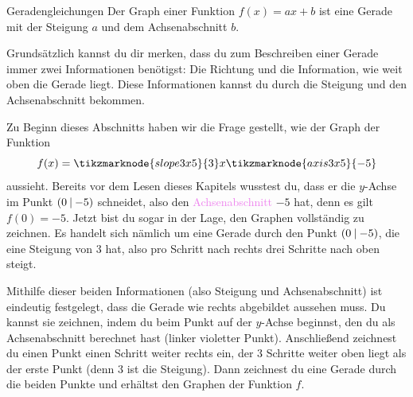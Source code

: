 \documentclass[../../main.tex]{subfiles}
\begin{document}
\begin{theorem}{Geradengleichungen}
    Der Graph einer Funktion $f(x)=ax+b$ ist eine Gerade mit der Steigung $a$ und dem Achsenabschnitt $b$.
\end{theorem}

Grundsätzlich kannst du dir merken, dass du zum Beschreiben einer Gerade immer zwei Informationen benötigst: Die Richtung und die Information, wie weit oben die Gerade liegt. Diese Informationen kannst du durch die Steigung und den Achsenabschnitt bekommen.

\begin{example}{}
    Zu Beginn dieses Abschnitts haben wir die Frage gestellt, wie der Graph der Funktion 
    \[f(x)=\tikzmarknode{slope3x5}{3}x\tikzmarknode{axis3x5}{-5}\] 
    aussieht. Bereits vor dem Lesen dieses Kapitels wusstest du, dass er die $y$-Achse im Punkt $\left(0 \:\middle|\: -5\right)$ schneidet, also den \textcolor{violet}{Achsenabschnitt} $-5$ hat, denn es gilt $f(0)=-5$.
    Jetzt bist du sogar in der Lage, den Graphen vollständig zu zeichnen. Es handelt sich nämlich um eine Gerade durch den Punkt $\left(0 \:\middle|\: -5\right)$, die eine \textcolor{maincolor}{Steigung} von $3$ hat, also pro Schritt nach rechts drei Schritte nach oben steigt.

    Mithilfe dieser beiden Informationen (also Steigung und Achsenabschnitt) ist eindeutig festgelegt, dass die Gerade wie rechts abgebildet aussehen muss. Du kannst sie zeichnen, indem du beim Punkt auf der $y$-Achse beginnst, den du als Achsenabschnitt berechnet hast (linker violetter Punkt). Anschließend zeichnest du einen Punkt einen Schritt weiter rechts ein, der $3$ Schritte weiter oben liegt als der erste Punkt (denn $3$ ist die Steigung). Dann zeichnest du eine Gerade durch die beiden Punkte und erhältst den Graphen der Funktion $f$.
\end{example}
\end{document}
